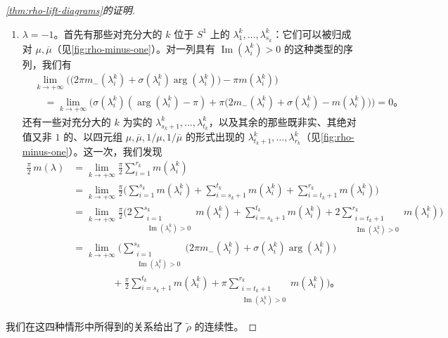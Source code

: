 \begin{proof}[\cref{thm:rho-lift-diagrams}的证明]
\begin{enumerate}[label=(\arabic*)]
\[
\frac{\pi}{2}\,m(\lambda)=\sum_{i=1}^{r_k}\frac{\pi}{2}\,m(\lambda^k_i)
=\sum_{i=1}^{t_k}\frac{\pi}{2}\,m(\lambda^k_i)
+\pi\!\!\sum_{\substack{i=t_k+1\\ \operatorname{Im}(\lambda^k_i)>0}}^{r_k}m(\lambda^k_i)\text{。}
\]
\item $\lambda=-1$。首先有那些对充分大的 $k$ 位于 $S^1$ 上的\trEigenvalue{} $\lambda^k_1,\dotsc,\lambda^k_{s_k}$：它们可以被归成对 $\mu,\overline{\mu}$（见\cref{fig:rho-minus-one}）。对一列具有 $\operatorname{Im}(\lambda^k_i)>0$ 的这种类型的序列，我们有
\[
\begin{aligned}
&\lim_{k\to+\infty}\bigl(\bigl(2\pi m_-(\lambda^k_i)+\sigma(\lambda^k_i)\arg(\lambda^k_i)\bigr)-\pi m(\lambda^k_i)\bigr)\\
&\quad=\lim_{k\to+\infty}\bigl(\sigma(\lambda^k_i)(\arg(\lambda^k_i)-\pi)
+\pi\bigl(2m_-(\lambda^k_i)+\sigma(\lambda^k_i)-m(\lambda^k_i)\bigr)\bigr)=0\text{。}
\end{aligned}
\]
还有一些对充分大的 $k$ 为实的\trEigenvalue{} $\lambda^k_{s_k+1},\dotsc,\lambda^k_{t_k}$，以及其余的那些既非实、其绝对值又非 $1$ 的、以四元组 $\mu,\overline{\mu},1/\mu,1/\overline{\mu}$ 的形式出现的\trEigenvalue{} $\lambda^k_{t_k+1},\dotsc,\lambda^k_{r_k}$（见\cref{fig:rho-minus-one}）。这一次，我们发现
\[
\begin{aligned}
\frac{\pi}{2}\,m(\lambda)
&=\lim_{k\to+\infty}\frac{\pi}{2}\sum_{i=1}^{r_k}m(\lambda^k_i)\\
&=\lim_{k\to+\infty}\frac{\pi}{2}\biggl(\sum_{i=1}^{s_k}m(\lambda^k_i)
+\sum_{i=s_k+1}^{t_k}m(\lambda^k_i)+\sum_{i=t_k+1}^{r_k}m(\lambda^k_i)\biggr)\\
&=\lim_{k\to+\infty}\frac{\pi}{2}\biggl(2\!\!\sum_{\substack{i=1\\ \operatorname{Im}(\lambda^k_i)>0}}^{s_k}m(\lambda^k_i)
+\sum_{i=s_k+1}^{t_k}m(\lambda^k_i)
+2\!\!\sum_{\substack{i=t_k+1\\ \operatorname{Im}(\lambda^k_i)>0}}^{r_k}m(\lambda^k_i)\biggr)\\
&=\lim_{k\to+\infty}\biggl(\sum_{\substack{i=1\\ \operatorname{Im}(\lambda^k_i)>0}}^{s_k}
\bigl(2\pi m_-(\lambda^k_i)+\sigma(\lambda^k_i)\arg(\lambda^k_i)\bigr)\\
&\qquad\qquad+\frac{\pi}{2}\sum_{i=s_k+1}^{t_k}m(\lambda^k_i)
+\pi\!\!\sum_{\substack{i=t_k+1\\ \operatorname{Im}(\lambda^k_i)>0}}^{r_k}m(\lambda^k_i)\biggr)\text{。}
\end{aligned}
\]
\end{enumerate}
我们在这四种情形中所得到的关系给出了 $\tilde{\rho}$ 的连续性。
\end{proof}

